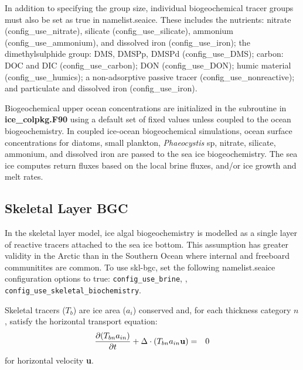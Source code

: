 In addition to specifying the group size, individual biogeochemical
tracer groups must also be set as true in namelist.seaice.
These includes the nutrients: nitrate (config\_use\_nitrate), silicate
(config\_use\_silicate), ammonium (config\_use\_ammonium), and
dissolved iron (config\_use\_iron);  the dimethylsulphide group: DMS, DMSPp,
DMSPd (config\_use\_DMS); carbon: DOC and DIC (config\_use\_carbon);
DON (config\_use\_DON);
humic material (config\_use\_humics); a non-adsorptive passive tracer
(config\_use\_nonreactive); and particulate and dissolved iron (config\_use\_iron).

Biogeochemical upper ocean concentrations are initialized in the
subroutine 
in {\bf ice\_colpkg.F90} using a default set of fixed values unless
coupled to the ocean biogeochemistry. In coupled ice-ocean
biogeochemical simulations, ocean surface concentrations for diatoms,
small plankton, {\it Phaeocystis} sp, nitrate, silicate, ammonium, and
dissolved iron are passed to the sea ice biogeochemistry.  The sea ice
computes return fluxes based on the local brine fluxes, and/or ice growth
and melt rates.

\subsection{Skeletal Layer BGC}

In the skeletal layer model, ice algal biogeochemistry is modelled as a single layer
of reactive tracers attached to the sea ice bottom. This assumption
has greater validity in the Arctic than in the Southern Ocean where internal
and freeboard communitites are common.
To use skl-bgc, set the following namelist.seaice configuration options
to true: {\tt config\_use\_brine}, ,
{\tt config\_use\_skeletal\_biochemistry}.

Skeletal tracers ($T_{b}$) are ice area ($a_{i}$) conserved
and, for each thickness category $n$, satisfy the horizontal transport equation:
\begin{eqnarray}
\label{eqn:bgc_tracer_thickness_cons}
\frac{\partial (T_{bn} a_{in})}{\partial t} + \Delta \cdot (T_{bn} a_{in} {\bf u}) & = & 0
\end{eqnarray}
for horizontal velocity {\bf u}.

